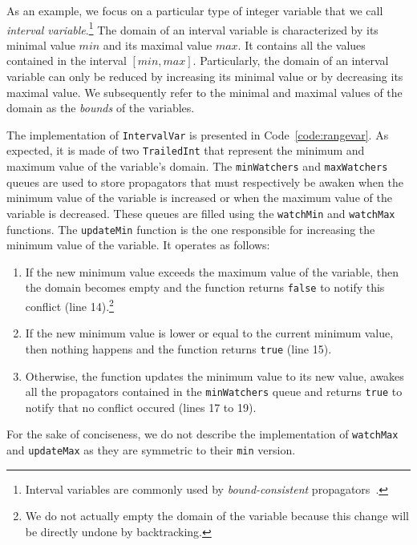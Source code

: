 \documentclass{llncs}
\begin{document}
\noindent
As an example, we focus on a particular type of integer variable that we call \emph{interval variable}.\footnote{Interval variables are commonly used by \emph{bound-consistent} propagators~\cite{handbook}.}
The domain of an interval variable is characterized by its minimal value $min$ and its maximal value $max$.
It contains all the values contained in the interval $[min, max]$.
Particularly, the domain of an interval variable can only be reduced by increasing its minimal value or by decreasing its maximal value. 
We subsequently refer to the minimal and maximal values of the domain as the \emph{bounds} of the variables.

The implementation of \texttt{IntervalVar} is presented in Code~\ref{code:rangevar}.
As expected, it is made of two \texttt{TrailedInt} that represent the minimum and maximum value of the variable's domain.
The \texttt{minWatchers} and \texttt{maxWatchers} queues are used to store propagators that must respectively be awaken when the minimum value of the variable is increased or when the maximum value of the variable is decreased. 
These queues are filled using the \texttt{watchMin} and \texttt{watchMax} functions. 
The \texttt{updateMin} function is the one responsible for increasing the minimum value of the variable. 
It operates as follows:
\begin{enumerate}
  \item If the new minimum value exceeds the maximum value of the variable, then the domain becomes empty and the function returns \texttt{false} to notify this conflict (line 14).\footnote{We do not actually empty the domain of the variable because this change will be directly undone by backtracking.}
  \item If the new minimum value is lower or equal to the current minimum value, then nothing happens and the function returns \texttt{true} (line 15).
  \item Otherwise, the function updates the minimum value to its new value, awakes all the propagators contained in the \texttt{minWatchers} queue and returns \texttt{true} to notify that no conflict occured (lines 17 to 19). 
\end{enumerate}
For the sake of conciseness, we do not describe the implementation of \texttt{watchMax} and \texttt{updateMax} as they are symmetric to their \texttt{min} version.
\end{document}

